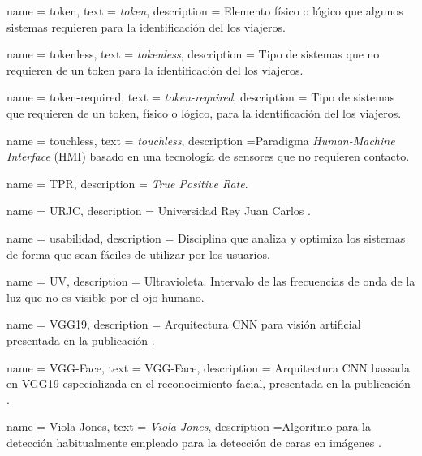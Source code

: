 {
    name        = token,
    text        = \textit{token},
    description = {Elemento físico o lógico que algunos sistemas  requieren para la identificación del los viajeros.}
}

{
    name        = tokenless,
    text        = \mbox{\textit{tokenless}},
    description = {Tipo de sistemas  que no requieren de un \gls{token} para la identificación del los viajeros.}
}

{
    name        = token-required,
    text        = {\mbox{\textit{token-required}}},
    description = {Tipo de sistemas  que requieren de un \gls{token}, físico o lógico, para la identificación del los viajeros.}
}

{
    name        = touchless,
    text        = {\textit{touchless}},
    description ={Paradigma \textit{Human-Machine Interface} (HMI) basado en una tecnología de sensores que no requieren contacto.}
}

{
    name        = TPR,
    description = {\textit{True Positive Rate}.}
}

{
    name        = {URJC},
    description = {Universidad Rey Juan Carlos \cite{urjcOnline}.}
}

{
    name        = {usabilidad},
    description = {Disciplina que analiza y optimiza los sistemas de forma que sean fáciles de utilizar por los usuarios.}
}

{
    name        = {UV},
    description = {Ultravioleta. Intervalo de las frecuencias de onda de la luz que no es visible por el ojo humano. }
}

{
    name        = VGG19,
    description = {Arquitectura CNN para visión artificial presentada en la publicación \cite{simonyan2014very}.}
}

{
    name        = VGG-Face,
    text        = {\mbox{VGG-Face}},
    description = {Arquitectura CNN bassada en VGG19 especializada en el reconocimiento facial, presentada en la publicación \cite{parkhi2015deep}.}
}

{
    name        = Viola-Jones,
    text        = {\mbox{\textit{Viola-Jones}}},
    description ={Algoritmo para la detección habitualmente empleado para la detección de caras en imágenes \cite{viola2004robust}.}
}

